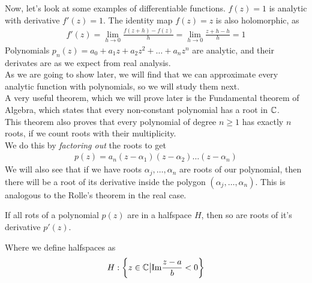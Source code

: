 Now, let's look at some examples of differentiable functions.
$f(z) = 1$ is analytic with derivative $f'(z) = 1$. The identity map $f(z) = z$ is also holomorphic, as
\begin{align*}
				f'(z) = \lim_{h \to 0} \frac{f(z+h) - f(z)}{h} = \lim_{h \to 0} \frac{z + h - h}{h} = 1
\end{align*}
Polynomials $p_n(z) = a_0 + a_1 z + a_2z^2 + \ldots + a_nz^n$ are analytic, and their derivates are as we expect from real analysis.\\
As we are going to show later, we will find that we can approximate every analytic function with polynomials, so we will study them next.\\
A very useful theorem, which we will prove later is the Fundamental theorem of Algebra, which states that every non-constant polynomial has a root in $\mathbb{C}$.\\
This theorem also proves that every polynomial of degree $n \geq 1$ has exactly $n$ roots, if we count roots with their multiplicity.\\
We do this by \emph{factoring out} the roots to get
\begin{align*}
				p(z) = a_n(z - \alpha_1)(z - \alpha_2) \dots (z - \alpha_n)
\end{align*}
We will also see that if we have roots $\alpha_j, \ldots, \alpha_n$ are roots of our polynomial, then there will be a root of its derivative inside the polygon $( \alpha_j, \ldots, \alpha_n)$. This is analogous to the Rolle's theorem in the real case.\\


\begin{ntheorem}
	If all rots of a polynomial $p(z)$ are in a halfspace $H$, then so are roots of it's derivative $p'(z)$.
\end{ntheorem}
Where we define halfspaces as 
\begin{align*}
	H: \left\{z \in \mathbb{C} \big\vert \text{Im}\frac{z - a}{b} < 0\right\}
\end{align*}

